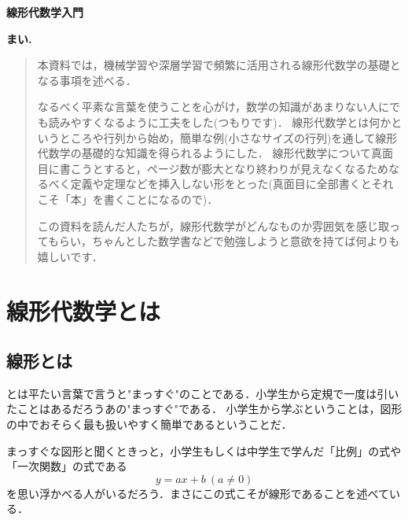 \documentclass[a4paper,12pt,autodetect-engine,dvipdfmx]{jsarticle}
\def\RC{\rowcolor{red!30}}
\theoremstyle{definition}
\begin{document}
\begin{center}
{\LARGE{ \bf{線形代数学入門} }}

\vspace{10mm}

{\Large{ \bf{まい.}}}
\end{center}

\bigskip
\begin{abstract}
本資料では，機械学習や深層学習で頻繁に活用される線形代数学の基礎となる事項を述べる．

なるべく平素な言葉を使うことを心がけ，数学の知識があまりない人にでも読みやすくなるように工夫をした(つもりです)．
線形代数学とは何かというところや行列から始め，簡単な例(小さなサイズの行列)を通して線形代数学の基礎的な知識を得られるようにした．
線形代数学について真面目に書こうとすると，ページ数が膨大となり終わりが見えなくなるためなるべく定義や定理などを挿入しない形をとった(真面目に全部書くとそれこそ「本」を書くことになるので)．

この資料を読んだ人たちが，線形代数学がどんなものか雰囲気を感じ取ってもらい，ちゃんとした数学書などで勉強しようと意欲を持てば何よりも嬉しいです．
\end{abstract}
\newpage
\tableofcontents 


\newpage
\section{線形代数学とは}
\subsection{線形とは}
とは平たい言葉で言うと"まっすぐ"のことである．小学生から定規で一度は引いたことはあるだろうあの"まっすぐ"である．
小学生から学ぶということは，図形の中でおそらく最も扱いやすく簡単であるということだ．


まっすぐな図形と聞くときっと，小学生もしくは中学生で学んだ「比例」の式や「一次関数」の式である
\begin{equation*}
    y = ax + b \ (a \neq 0)
\end{equation*}
を思い浮かべる人がいるだろう．まさにこの式こそが線形であることを述べている．
\end{document}
